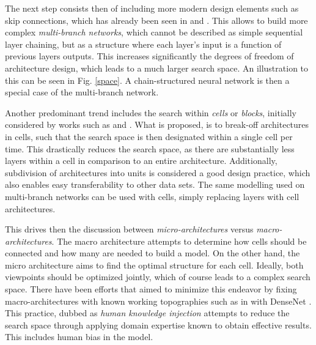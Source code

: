 \documentclass[10pt,        %
               a4paper,     %
               journal,     %
               ]{IEEEtran}
\begin{document}
The next step consists then of including more modern design elements such as skip connections, which has already been seen
in \cite{zoph2016neural} and \cite{pmlr-v70-real17a}. This allows to build more complex \textit{multi-branch networks}, which
cannot be described as simple sequential layer chaining, but as a structure where each layer's input is a function of
previous layers outputs. This increases significantly the degrees of freedom of architecture design,
which leads to a much larger search space.
An illustration to this can be seen in Fig. \ref{space}.
A chain-structured neural network is then a special case of the multi-branch network.

Another predominant trend includes the search within \textit{cells} or \textit{blocks}, initially considered by works such as
\cite{zhong2018practical} and \cite{zoph2018learning}. What is proposed, is to break-off architectures in cells, such that
the search space is then designated within a single cell per time. This drastically reduces the search space, as there are
substantially less layers within a cell in comparison to an entire architecture. Additionally, subdivision of architectures
into units is considered a good design practice, which also enables easy transferability to other data sets. The same
modelling used on multi-branch networks can be used with cells, simply replacing layers with cell architectures.

This drives then the discussion between \textit{micro-architectures} versus \textit{macro-architectures}. The macro architecture
attempts to determine how cells should be connected and how many are needed to build a model. On the other hand, the micro
architecture aims to find the optimal structure for each cell. Ideally, both viewpoints should be optimized jointly, which of course
leads to a complex search space. There have been efforts that aimed to minimize this endeavor by fixing macro-architectures with
known working topographies such as in \cite{pmlr-v80-cai18a} with DenseNet \cite{Huang_2017_CVPR}. This practice, dubbed as
\textit{human knowledge injection} attempts to reduce the search space through applying domain expertise known to obtain
effective results. This includes human bias in the model.
\end{document}
